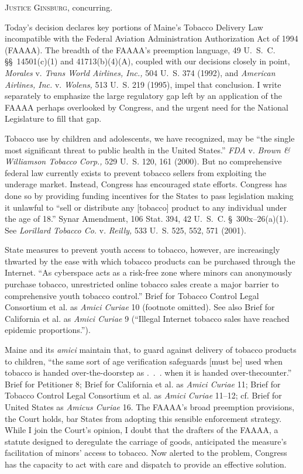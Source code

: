 
\setcounter{page}{377}

  \textsc{Justice Ginsburg,} concurring.

  Today's decision declares key portions of Maine's Tobacco Delivery
Law incompatible with the Federal Aviation Administration Authorization
Act of 1994 (FAAAA). The breadth of the FAAAA's preemption language,
49 U.~S.~C. \S\S~14501(c)(1) and 41713(b)(4)(A), coupled with our
decisions closely in point, \emph{Morales} v. \emph{Trans World Airlines,
Inc.,} 504 U.~S. 374 (1992), and \emph{American Airlines, Inc.} v.
\emph{Wolens,} 513 U.~S. 219 (1995), impel that conclusion. I write
separately to emphasize the large regulatory gap left by an application
of the FAAAA perhaps overlooked by Congress, and the urgent need for the
National Legislature to fill that gap.

  Tobacco use by children and adolescents, we have recognized, may be
``the single most significant threat to public health in the United
States.'' \emph{FDA} v. \emph{Brown \& Williamson Tobacco Corp.,} 529 U.~S.
120, 161 (2000). But no comprehensive federal law currently exists to
prevent tobacco sellers from exploiting the underage market. Instead,
Congress has encouraged state efforts. Congress has done so by providing
funding incentives for the States to pass legislation making it unlawful
to ``sell or distribute any [tobacco] product to any individual under
the age of 18.'' Synar Amend\newpage ment, 106 Stat. 394, 42 U.~S.~C.
\S~300x--26(a)(1). See \emph{Lorillard Tobacco Co.} v. \emph{Reilly,} 533
U.~S. 525, 552, 571 (2001).

  State measures to prevent youth access to tobacco, however, are
increasingly thwarted by the ease with which tobacco products can be
purchased through the Internet. ``As cyberspace acts as a risk-free
zone where minors can anonymously purchase tobacco, unrestricted online
tobacco sales create a major barrier to comprehensive youth tobacco
control.'' Brief for Tobacco Control Legal Consortium et al. as
\emph{Amici Curiae} 10 (footnote omitted). See also Brief for California
et al. as \emph{Amici Curiae} 9 (``Illegal Internet tobacco sales have
reached epidemic proportions.'').

  Maine and its \emph{amici} maintain that, to guard against delivery of
tobacco products to children, ``the same sort of age verification
safeguards [must be] used when tobacco is handed over-the-doorstep as
.~.~. when it is handed over-thecounter.'' Brief for Petitioner 8;
Brief for California et al. as \emph{Amici Curiae} 11; Brief for Tobacco
Control Legal Consortium et al. as \emph{Amici Curiae} 11--12; cf. Brief
for United States as \emph{Amicus Curiae} 16. The FAAAA's broad
preemption provisions, the Court holds, bar States from adopting this
sensible enforcement strategy. While I join the Court's opinion, I
doubt that the drafters of the FAAAA, a statute designed to deregulate
the carriage of goods, anticipated the measure's facilitation of
minors' access to tobacco. Now alerted to the problem, Congress has
the capacity to act with care and dispatch to provide an effective
solution.
